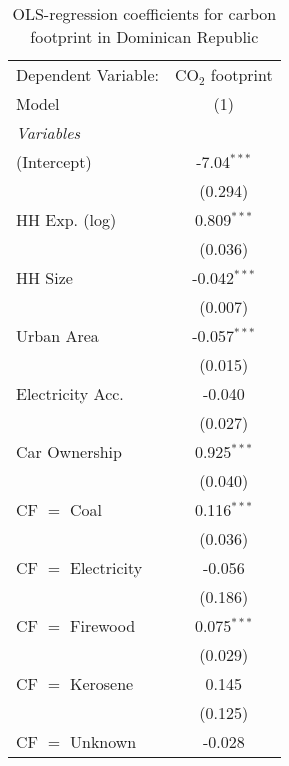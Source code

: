 
\begin{table}[htbp!]
   \centering
   \small
   \begin{adjustbox}{width = 1\textwidth, max height = 0.95\textheight, center}
      \begin{threeparttable}[b]
         \caption{\label{tab:OLS_2_DOM} OLS-regression coefficients for carbon footprint in Dominican Republic}
         \begin{tabular}{lc}
            \tabularnewline \midrule \midrule
            Dependent Variable: & CO$_{2}$ footprint\\  
            Model               & (1)\\  
            \midrule
            \emph{Variables}\\
            (Intercept)         & -7.04$^{***}$\\   
                                & (0.294)\\   
            HH Exp. (log)       & 0.809$^{***}$\\   
                                & (0.036)\\   
            HH Size             & -0.042$^{***}$\\   
                                & (0.007)\\   
            Urban Area          & -0.057$^{***}$\\   
                                & (0.015)\\   
            Electricity Acc.    & -0.040\\   
                                & (0.027)\\   
            Car Ownership       & 0.925$^{***}$\\   
                                & (0.040)\\   
            CF $=$ Coal         & 0.116$^{***}$\\   
                                & (0.036)\\   
            CF $=$ Electricity  & -0.056\\   
                                & (0.186)\\   
            CF $=$ Firewood     & 0.075$^{***}$\\   
                                & (0.029)\\   
            CF $=$ Kerosene     & 0.145\\   
                                & (0.125)\\   
            CF $=$ Unknown      & -0.028\\   

\end{tabular}
\end{threeparttable}
\end{adjustbox}
\end{table}
